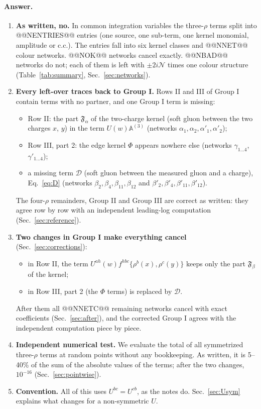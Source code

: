 \documentclass[10pt]{article}
\numberwithin{equation}{section}
\newcommand{\NN}{\mathcal N}
\begin{document}
\paragraph{Answer.}
\begin{enumerate}
\item \textbf{As written, no.} In common integration variables the three-$\rho$ terms split into @@NENTRIES@@ entries (one source, one sub-term, one kernel monomial, amplitude or c.c.). The entries fall into six kernel classes and @@NNET@@ colour networks. @@NOK@@ networks cancel exactly. @@NBAD@@ networks do not; each of them is left with $\pm2i\NN$ times one colour structure (Table~\ref{tab:summary}, Sec.~\ref{sec:networks}).
\item \textbf{Every left-over traces back to Group I.} Rows II and III of Group I contain terms with no partner, and one Group I term is missing:
\begin{itemize}
\item Row II: the part $\mathfrak F_\alpha$ of the two-charge kernel (soft gluon between the two charges $x$, $y$) in the term $U(w)\mathbb A^{(3)}$ (networks $\alpha_1,\alpha_2,\alpha'_1,\alpha'_2$);
\item Row III, part 2: the edge kernel $\Phi$ appears nowhere else (networks $\gamma_{1\ldots4}$, $\gamma'_{1\ldots4}$);
\item a missing term $\mathcal D$ (soft gluon between the measured gluon and a charge), Eq.~\eqref{eq:D} (networks $\beta_2,\beta_4,\beta_{11},\beta_{12}$ and $\beta'_2,\beta'_4,\beta'_{11},\beta'_{12}$).
\end{itemize}
The four-$\rho$ remainders, Group II and Group III are correct as written: they agree row by row with an independent leading-log computation (Sec.~\ref{sec:reference}).
\item \textbf{Two changes in Group I make everything cancel} (Sec.~\ref{sec:corrections}):
\begin{itemize}
\item[(1)] in Row II, the term $U^{ah}(w)f^{hbc}\{\rho^b(x),\rho^c(y)\}$ keeps only the part $\mathfrak F_\beta$ of the kernel;
\item[(2)] in Row III, part 2 (the $\Phi$ terms) is replaced by $\mathcal D$.
\end{itemize}
After them all @@NNETC@@ remaining networks cancel with exact coefficients (Sec.~\ref{sec:after}), and the corrected Group I agrees with the independent computation piece by piece.
\item \textbf{Independent numerical test.} We evaluate the total of all symmetrized three-$\rho$ terms at random points without any bookkeeping. As written, it is 5--40\% of the sum of the absolute values of the terms; after the two changes, $10^{-16}$ (Sec.~\ref{sec:pointwise}).
\item \textbf{Convention.} All of this uses $U^{bc}=U^{cb}$, as the notes do. Sec.~\ref{sec:Usym} explains what changes for a non-symmetric $U$.
\end{enumerate}
\end{document}
